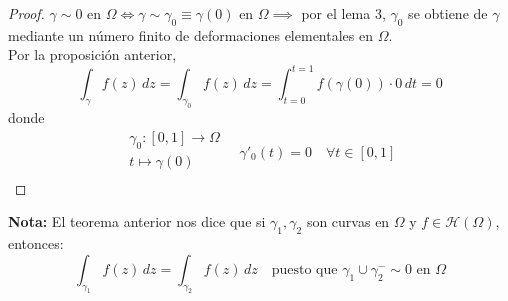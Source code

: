 \begin{proof}
    $\gamma \sim 0$ en $\Omega \iff \gamma \sim \gamma_0 \equiv \gamma(0)$ en $\Omega \implies$ por el lema 3, $\gamma_0$ se obtiene de $\gamma$ mediante un número finito de deformaciones elementales en $\Omega$.\\
    Por la proposición anterior, 
    \[
        \int_{\gamma} f(z) \, dz = \int_{\gamma_0} f(z) \, dz = \int_{t=0}^{t=1} f(\gamma(0)) \cdot 0 \, dt = 0
    \]
    donde 
    \[
        \begin{matrix}
            \gamma_0 : [0,1] \to \Omega \\
            t \mapsto \gamma(0)\\
        \end{matrix} \quad \gamma'_0(t) = 0 \quad \forall t \in [0,1]
    \]
\end{proof}

\textbf{Nota:} El teorema anterior nos dice que si $\gamma_1, \gamma_2$ son curvas en $\Omega$ y $f \in \mathcal{H}(\Omega)$, entonces:
\[
    \int_{\gamma_1} f(z) \, dz = \int_{\gamma_2} f(z) \, dz \quad \text{puesto que }\gamma_1 \cup \gamma_2^- \sim 0 \text{ en } \Omega
\]

